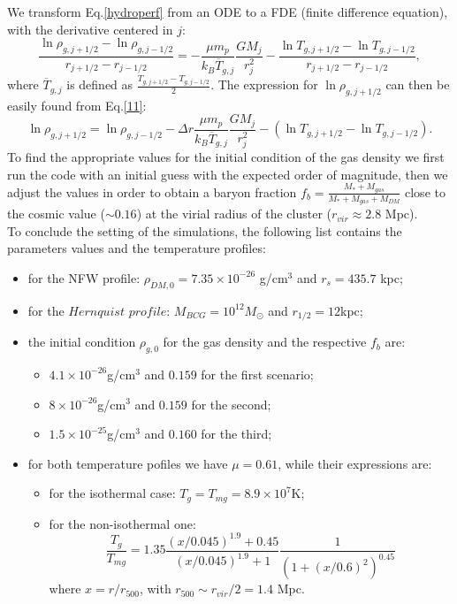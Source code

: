 \documentclass{article}
\begin{document}
We transform Eq.\eqref{hydroperf} from an ODE to a FDE (finite difference equation), with the derivative centered in $j$:
\begin{equation}\label{11}
	\frac{\ln \rho_{g,j+1/2}-\ln \rho_{g,j-1/2}}{r_{j+1/2}-r_{j-1/2}}=-\frac{\mu m_{p}}{k_{B}\overline{T}_{g,j}}\frac{GM_{j}}{r_{j}^{2}}-\frac{\ln T_{g,j+1/2}-\ln T_{g,j-1/2}}{r_{j+1/2}-r_{j-1/2}},
\end{equation}
where $\overline{T}_{g,j}$ is defined as $\frac{T_{g,j+1/2}-T_{g,j-1/2}}{2}$. The expression for $\ln \rho_{g,j+1/2}$ can then be easily found from Eq.\eqref{11}:
\begin{equation} \label{numrho}
	\ln\rho_{g,j+1/2}=\ln\rho_{g,j-1/2}-\Delta r\frac{\mu m_{p}}{k_{B}\overline{T}_{g,j}}\frac{GM_{j}}{r_{j}^{2}}-(\ln T_{g,j+1/2}-\ln T_{g,j-1/2}).
\end{equation}
To find the appropriate values for the initial condition of the gas density we first run the code with an initial guess with the expected order of magnitude, then we adjust the values in order
to obtain a baryon fraction $f_{b}=\frac{M_{*}+M_{gas}}{M_{*}+M_{gas}+M_{DM}}$ close to the cosmic value ($\sim 0.16$) at the virial radius of the cluster ($r_{vir}\approx 2.8$ Mpc).\\
To conclude the setting of the simulations, the following list contains the parameters values and the temperature profiles:
\begin{itemize}
	\item for the NFW profile: $\rho_{DM,0}=7.35\times 10^{-26}$ g/cm$^{3}$ and $r_{s}=435.7$ kpc;
	\item for the $Hernquist$ $ profile$: $M_{BCG}=10^{12} M_{\odot}$ and $r_{1/2}=12$kpc;
	\item the initial condition $\rho_{g,0}$ for the gas density and the respective $f_{b}$ are: \begin{itemize}
		\item $4.1\times 10^{-26}$g/cm$^{3}$ and $0.159$ for the first scenario;
		\item $8\times 10^{-26}$g/cm$^{3}$ and $0.159$ for the second;
		\item $1.5\times 10^{-25}$g/cm$^{3}$ and $0.160$ for the third;
	\end{itemize}
	\item for both temperature pofiles we have $\mu=0.61$, while their expressions are:
	\begin{itemize}
		\item for the isothermal case: $T_{g}=T_{mg}=8.9\times 10^{7}$K;
		\item for the non-isothermal one:
		\begin{equation}\label{Tprof}
			\frac{T_{g}}{T_{mg}}=1.35\frac{(x/0.045)^{1.9}+0.45}{(x/0.045)^{1.9}+1}\frac{1}{(1+(x/0.6)^{2})^{0.45}}
		\end{equation}
		where $x=r/r_{500}$, with $r_{500}\sim r_{vir}/2=1.4$ Mpc.
	\end{itemize}
\end{itemize}
\end{document}
